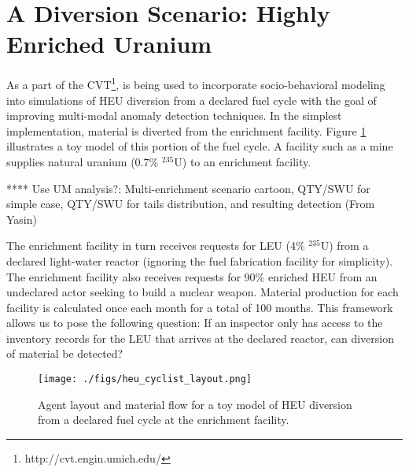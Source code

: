 \section{A Diversion Scenario: Highly Enriched Uranium}
\label{s_results}
As a part of the \gls{CVT}\footnote{http://cvt.engin.umich.edu/}, \Cyclus is being used to incorporate socio-behavioral modeling into simulations of \gls{HEU} diversion from a declared fuel cycle with the goal of improving multi-modal anomaly detection techniques.  In the simplest implementation, material is diverted from the enrichment facility.  Figure \ref{fig:heu_layout} illustrates a toy model of this portion of the fuel cycle. A facility such as a mine supplies natural uranium (0.7\% $^{235}$U) to an enrichment facility. 

**** Use UM analysis?: Multi-enrichment scenario cartoon, QTY/SWU for simple case, QTY/SWU for tails distribution, and resulting detection (From Yasin)











 The enrichment facility in turn receives requests for  \gls{LEU} (4\% $^{235}$U) from a declared light-water reactor (ignoring the fuel fabrication facility for simplicity).  The enrichment facility also receives requests for 90\% enriched \gls{HEU} from an undeclared actor seeking to build a nuclear weapon. Material production for each facility is calculated once each month for a total of 100 months.  This framework allows us to pose the following question: If an inspector only has access to the inventory records for the \gls{LEU} that arrives at the declared reactor, can diversion of material be detected?

\begin{figure}%
\begin{center}
\texttt{[image: ./figs/heu\_cyclist\_layout.png]}
\end{center}
\caption{Agent layout and material flow for a toy model of \gls{HEU} diversion from a declared fuel cycle at the enrichment facility.}
\label{fig:heu_layout}
\end{figure}

